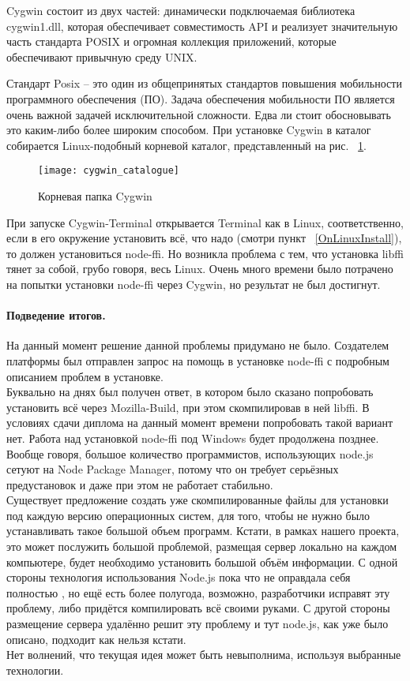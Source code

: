 Cygwin состоит из двух частей: динамически подключаемая библиотека cygwin1.dll, которая обеспечивает совместимость API и реализует значительную часть стандарта POSIX и огромная коллекция приложений, которые обеспечивают привычную среду UNIX.

Стандарт Posix – это один из общепринятых стандартов повышения мобильности программного обеспечения (ПО).  Задача обеспечения мобильности ПО является очень важной задачей исключительной сложности. Едва ли стоит обосновывать это каким-либо более широким способом.
При установке Cygwin в каталог собирается Linux-подобный корневой каталог, представленный на рис. ~\ref{cygwin_catalogue}.
\begin{figure}[!ht]
	\begin{center}
		\texttt{[image: cygwin\_catalogue]}
	\end{center}
	\caption{Корневая папка Cygwin}
	\label{cygwin_catalogue}
\end{figure}

	При запуске Cygwin-Terminal открывается Terminal как в Linux, соответственно, если в его окружение установить всё, что надо (смотри пункт ~\ref{OnLinuxInstall}), то должен установиться node-ffi. Но возникла проблема с тем, что установка libffi тянет за собой, грубо говоря, весь Linux. Очень много времени было потрачено на попытки установки node-ffi через Cygwin, но результат не был достигнут.
\paragraph{Подведение итогов.} На данный момент решение данной проблемы придумано не было. Создателем платформы был отправлен запрос на помощь в установке node-ffi с подробным описанием проблем в установке.\\
Буквально на днях был получен ответ, в котором было сказано попробовать установить всё через Mozilla-Build, при этом скомпилировав в ней libffi. В условиях сдачи диплома на данный момент времени попробовать такой вариант нет. Работа над установкой node-ffi под Windows будет продолжена позднее.  Вообще говоря, большое количество программистов, использующих node.js сетуют на Node Package Manager, потому что он требует серьёзных предустановок и даже при этом не работает стабильно. \\
Существует предложение создать уже скомпилированные файлы для установки под каждую версию операционных систем, для того, чтобы не нужно было устанавливать такое большой объем программ. Кстати, в рамках нашего проекта, это может послужить большой проблемой, размещая сервер локально на каждом компьютере, будет необходимо установить большой объём информации. С одной стороны технология использования Node.js пока что не оправдала себя полностью , но ещё есть более полугода, возможно, разработчики исправят эту проблему, либо придётся компилировать всё своими руками. С другой стороны размещение сервера удалённо решит эту проблему  и тут node.js, как уже было описано, подходит как нельзя кстати.\\
Нет волнений, что текущая идея может быть невыполнима, используя выбранные технологии.
